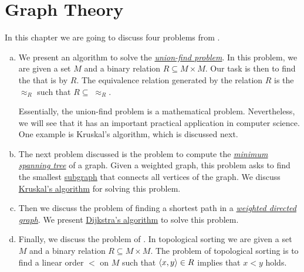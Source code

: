 \chapter{Graph Theory}
In this chapter we are going to discuss four problems from .
\begin{enumerate}[(a)]
\item We present an algorithm to solve the 
      \href{https://en.wikipedia.org/wiki/Disjoint-set_data_structure}{\emph{union-find problem}}.
      In this problem, we are given a set $M$ and a binary relation $R \subseteq M \times M$.  Our task is
      then to find the  that is  by $R$.  The equivalence relation
      generated by the relation $R$ is the  $\approx_R$ such that $R \subseteq\; \approx_R$.
      
      Essentially, the union-find problem is a mathematical problem.  Nevertheless, we will see that 
      it has an important practical application in computer science.  One example is Kruskal's algorithm,
      which is discussed next.
\item The next problem discussed is the problem to compute the
      \href{https://en.wikipedia.org/wiki/Minimum_spanning_tree}{\emph{minimum spanning tree}}
      of a graph.  Given a weighted graph, this problem asks to find the smallest 
      \href{https://en.wikipedia.org/wiki/Glossary_of_graph_theory_terms#subgraph}{subgraph} that 
      connects all vertices of the graph.  We discuss
      \href{https://en.wikipedia.org/wiki/Kruskal%27s_algorithm}{Kruskal's algorithm} 
      for solving this problem.  
\item Then we discuss the problem of finding a shortest path in a 
      \href{https://en.wikipedia.org/wiki/Directed_graph}{\emph{weighted directed graph}}.
      We present \href{https://en.wikipedia.org/wiki/Dijkstra%27s_algorithm}{Dijkstra's algorithm} to solve
      this problem.   
\item Finally, we discuss the problem of .  In topological sorting we are given a set
      $M$ and a binary relation $R \subseteq M \times M$.
      The problem of topological sorting is to find a linear order $<$ on $M$ such that $\pair(x,y) \in R$
      implies that $x < y$ holds.
\end{enumerate}

